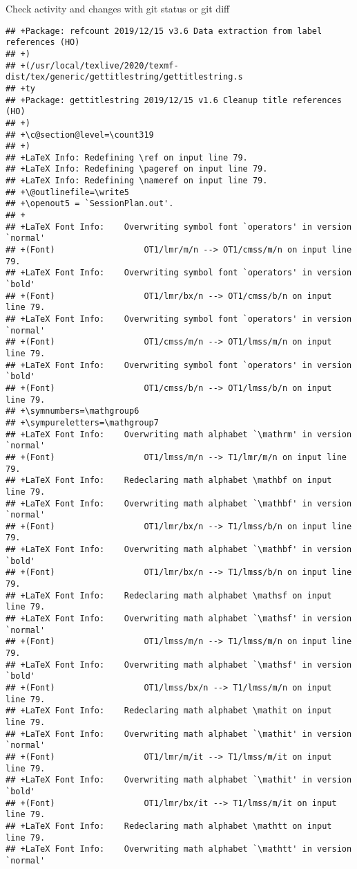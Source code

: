 \documentclass[ignorenonframetext,]{beamer}
\begin{document}
\begin{frame}[fragile]{Check activity and changes with git status or git
diff}
\begin{verbatim}
## +Package: refcount 2019/12/15 v3.6 Data extraction from label references (HO)
## +)
## +(/usr/local/texlive/2020/texmf-dist/tex/generic/gettitlestring/gettitlestring.s
## +ty
## +Package: gettitlestring 2019/12/15 v1.6 Cleanup title references (HO)
## +)
## +\c@section@level=\count319
## +)
## +LaTeX Info: Redefining \ref on input line 79.
## +LaTeX Info: Redefining \pageref on input line 79.
## +LaTeX Info: Redefining \nameref on input line 79.
## +\@outlinefile=\write5
## +\openout5 = `SessionPlan.out'.
## +
## +LaTeX Font Info:    Overwriting symbol font `operators' in version `normal'
## +(Font)                  OT1/lmr/m/n --> OT1/cmss/m/n on input line 79.
## +LaTeX Font Info:    Overwriting symbol font `operators' in version `bold'
## +(Font)                  OT1/lmr/bx/n --> OT1/cmss/b/n on input line 79.
## +LaTeX Font Info:    Overwriting symbol font `operators' in version `normal'
## +(Font)                  OT1/cmss/m/n --> OT1/lmss/m/n on input line 79.
## +LaTeX Font Info:    Overwriting symbol font `operators' in version `bold'
## +(Font)                  OT1/cmss/b/n --> OT1/lmss/b/n on input line 79.
## +\symnumbers=\mathgroup6
## +\sympureletters=\mathgroup7
## +LaTeX Font Info:    Overwriting math alphabet `\mathrm' in version `normal'
## +(Font)                  OT1/lmss/m/n --> T1/lmr/m/n on input line 79.
## +LaTeX Font Info:    Redeclaring math alphabet \mathbf on input line 79.
## +LaTeX Font Info:    Overwriting math alphabet `\mathbf' in version `normal'
## +(Font)                  OT1/lmr/bx/n --> T1/lmss/b/n on input line 79.
## +LaTeX Font Info:    Overwriting math alphabet `\mathbf' in version `bold'
## +(Font)                  OT1/lmr/bx/n --> T1/lmss/b/n on input line 79.
## +LaTeX Font Info:    Redeclaring math alphabet \mathsf on input line 79.
## +LaTeX Font Info:    Overwriting math alphabet `\mathsf' in version `normal'
## +(Font)                  OT1/lmss/m/n --> T1/lmss/m/n on input line 79.
## +LaTeX Font Info:    Overwriting math alphabet `\mathsf' in version `bold'
## +(Font)                  OT1/lmss/bx/n --> T1/lmss/m/n on input line 79.
## +LaTeX Font Info:    Redeclaring math alphabet \mathit on input line 79.
## +LaTeX Font Info:    Overwriting math alphabet `\mathit' in version `normal'
## +(Font)                  OT1/lmr/m/it --> T1/lmss/m/it on input line 79.
## +LaTeX Font Info:    Overwriting math alphabet `\mathit' in version `bold'
## +(Font)                  OT1/lmr/bx/it --> T1/lmss/m/it on input line 79.
## +LaTeX Font Info:    Redeclaring math alphabet \mathtt on input line 79.
## +LaTeX Font Info:    Overwriting math alphabet `\mathtt' in version `normal'

\end{verbatim}
\end{frame}
\end{document}
